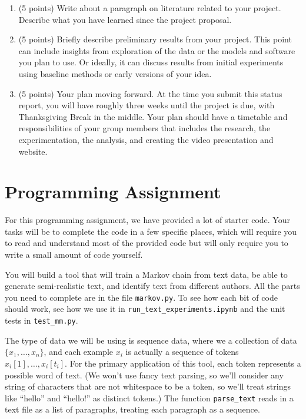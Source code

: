 \documentclass[10pt]{article}
\begin{document}
\begin{enumerate}

\item (5 points) Write about a paragraph on literature related to your project. Describe what you have learned since the project proposal.

\item (5 points) Briefly describe preliminary results from your project. This point can include insights from exploration of the data or the models and software you plan to use. Or ideally, it can discuss results from initial experiments using baseline methods or early versions of your idea.

\item (5 points) Your plan moving forward. At the time you submit this status report, you will have roughly three weeks until the project is due, with Thanksgiving Break in the middle. Your plan should have a timetable and responsibilities of your group members that includes the research, the experimentation, the analysis, and creating the video presentation and website.

\end{enumerate}

\section*{Programming Assignment}

For this programming assignment, we have provided a lot of starter code. Your tasks will be to complete the code in a few specific places, which will require you to read and understand most of the provided code but will only require you to write a small amount of code yourself.

You will build a tool that will train a Markov chain from text data, be able to generate semi-realistic text, and identify text from different authors. All the parts you need to complete are in the file \texttt{markov.py}. To see how each bit of code should work, see how we use it in \texttt{run\_text\_experiments.ipynb} and the unit tests in \texttt{test\_mm.py}.

The type of data we will be using is sequence data, where we a collection of data $\{x_1, \ldots, x_n\}$, and each example $x_i$ is actually a sequence of tokens $x_i[1], \ldots, x_i[t_i]$. For the primary application of this tool, each token represents a possible word of text. (We won't use fancy text parsing, so we'll consider any string of characters that are not whitespace to be a token, so we'll treat strings like ``hello'' and ``hello!'' as distinct tokens.) The function \texttt{parse\_text} reads in a text file as a list of paragraphs, treating each paragraph as a sequence.
\end{document}
